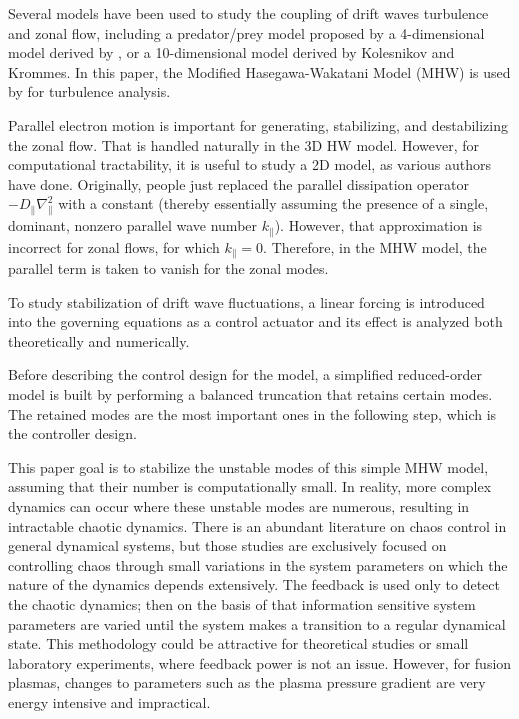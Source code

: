 \documentclass[12pt,lot, lof]{puthesis}
\begin{document}
Several models have been used to study the coupling of drift waves turbulence and zonal flow, including a predator/prey model proposed by \citet{diamond}  a 4-dimensional model derived by \citet{Chen}, or a 10-dimensional model derived by Kolesnikov and Krommes. \cite{Kolesnikov} In this paper, the Modified Hasegawa-Wakatani Model (MHW) is used by \citet{Numata} for turbulence analysis.

Parallel electron motion is important for generating, stabilizing, and destabilizing the zonal flow.
That is handled naturally in the 3D HW model.  However, for computational tractability, it is useful to study a 2D model, as various authors have done. \cite{Smolyakov, Numata} Originally, people just replaced the parallel dissipation operator $-D_\parallel \nabla_\parallel^2$ with a constant (thereby essentially assuming the presence of a single, dominant, nonzero parallel wave number $k_\parallel$).  However, that approximation is incorrect for zonal flows, for which $k_\parallel = 0$.  Therefore, in the MHW model, the parallel term is taken to vanish for the zonal modes. \cite{Smolyakov}

To study stabilization of drift wave fluctuations, a linear forcing is introduced into the governing equations as a control actuator and its effect is analyzed both theoretically and numerically.

Before describing the control design for the model, a simplified reduced-order model is built by performing a balanced truncation \cite{Moore}  that retains certain modes. The retained modes are the most important ones in the following step, which is the controller design. 

This paper goal is to stabilize the unstable modes of this simple MHW model, assuming that their number is computationally small.
In reality, more complex dynamics  can occur where these unstable modes are numerous, resulting in intractable chaotic dynamics.
There is an abundant literature on chaos control in general dynamical systems, \cite{Pyragas, Ott, Ditto, Shinbrot} but those studies are exclusively focused on controlling chaos through small variations in the system parameters on which the nature of the dynamics depends extensively. The feedback is used only to detect the chaotic dynamics; then on the basis of that information sensitive system parameters are varied until the system makes a transition to a regular dynamical state.
This methodology could be attractive for theoretical studies or small laboratory experiments, where feedback power is not an issue. However, for fusion plasmas, changes to parameters such as the plasma pressure gradient are very energy intensive and impractical.
\end{document}
